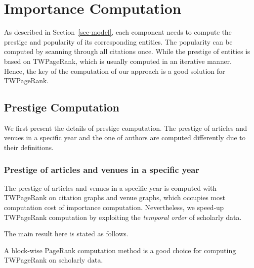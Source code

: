 \section{Importance Computation}
\label{sec-alg}

As described in Section~\ref{sec-model}, each component needs to compute the prestige and popularity of its corresponding entities.
The popularity can be computed by scanning through all citations once. While the prestige of entities is based on TWPageRank, which is usually computed in an iterative manner\cite{Brin98:PageRank}. %
Hence, the key of the computation of our approach  is a good solution for TWPageRank.


\subsection{Prestige Computation}
\label{subsec-prestige}

We first present the details of prestige computation. The prestige of articles and venues in a specific year and the one of authors are computed differently due to their definitions.

\subsubsection{Prestige of articles and venues in a specific year}
\label{subsubsec-prs-CV}

The prestige of articles and venues in a specific year is computed with TWPageRank on citation graphs and venue graphs, which occupies most computation cost of importance computation.
Nevertheless, we speed-up  TWPageRank computation by exploiting the {\em temporal order} of scholarly data.

The main result here is stated as follows.

\begin{theorem}
\label{thm-prestige}
A block-wise PageRank computation method is a good choice for computing TWPageRank on scholarly data.
\end{theorem}

